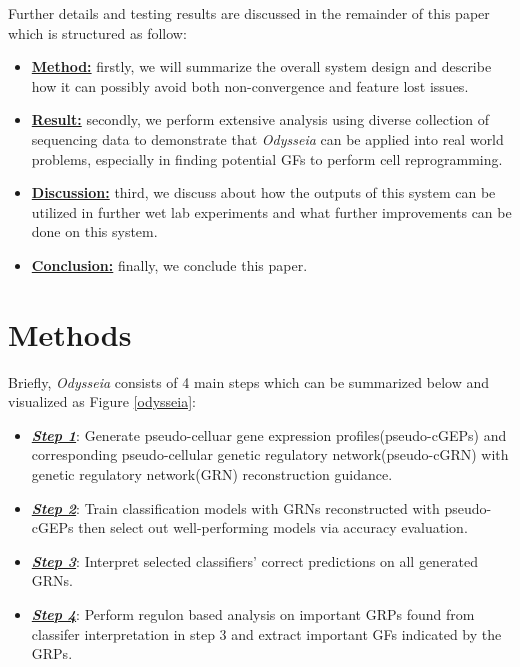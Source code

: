 \documentclass[fleqn,10pt]{wlscirep}
\begin{document}
Further details and testing results are discussed in the remainder of this paper which is structured as follow:
\begin{itemize}
\setlength\itemsep{0em}
\item{\hyperref[method]{\textbf{Method:}}}
    firstly, we will summarize the overall system design and describe how it can possibly avoid both non-convergence and feature lost issues.
\item {\hyperref[res]{\textbf{Result:}}}
    secondly, we perform extensive analysis using diverse collection of sequencing data to demonstrate that \emph{Odysseia} can be applied into real world problems, especially in finding potential GFs to perform cell reprogramming.
\item {\hyperref[disc]{\textbf{Discussion:}}}
    third, we discuss about how the outputs of this system can be utilized in further wet lab experiments and what further improvements can be done on this system.
\item {\hyperref[conc]{\textbf{Conclusion:}}}
    finally, we conclude this paper.
\end{itemize}

\section*{Methods}
\label{method}
Briefly, \emph{Odysseia} consists of 4 main steps which can be summarized below and visualized as Figure \ref{odysseia}:
\begin{itemize}
  \item \hyperref[step1]{\textbf{\emph{Step 1}}}: Generate pseudo-celluar gene expression profiles(pseudo-cGEPs) and corresponding pseudo-cellular genetic regulatory network(pseudo-cGRN) with genetic regulatory network(GRN) reconstruction guidance.
  \item \hyperref[step2]{\textbf{\emph{Step 2}}}: Train classification models with GRNs reconstructed with pseudo-cGEPs then select out well-performing models via accuracy evaluation.
  \item \hyperref[step3]{\textbf{\emph{Step 3}}}: Interpret selected classifiers' correct predictions on all generated GRNs.
  \item \hyperref[step4]{\textbf{\emph{Step 4}}}: Perform regulon based analysis on important GRPs found from classifer interpretation in step 3 and extract important GFs indicated by the GRPs.
\end{itemize}
\end{document}
